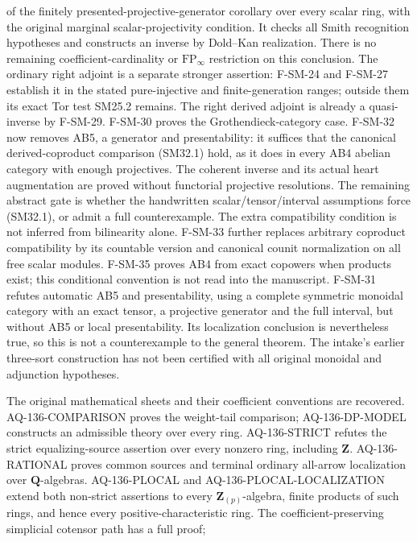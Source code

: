 \documentclass[11pt,a4paper]{article}
\theoremstyle{definition}\newtheorem{definition}[theorem]{Definition}
\theoremstyle{remark}\newtheorem{remark}[theorem]{Remark}
\begin{document}
\begin{description}[style=nextline,leftmargin=0pt,labelwidth=0pt,labelsep=0pt]
of the finitely presented-projective-generator corollary over every
scalar ring, with the original marginal scalar-projectivity condition.
It checks all Smith recognition hypotheses and constructs an inverse
by Dold--Kan realization. There is no remaining coefficient-cardinality
or $\mathrm{FP}_\infty$ restriction on this conclusion.
The ordinary right adjoint is a separate stronger assertion:
F-SM-24 and F-SM-27 establish it in the stated pure-injective and
finite-generation ranges; outside them its exact Tor test SM25.2
remains. The right derived adjoint is already a quasi-inverse by
F-SM-29. F-SM-30 proves the Grothendieck-category case.
F-SM-32 now removes AB5, a generator and presentability: it suffices
that the canonical derived-coproduct comparison (SM32.1) hold, as it
does in every AB4 abelian category with enough projectives. The
coherent inverse and its actual heart augmentation are proved without
functorial projective resolutions. The remaining abstract gate is
whether the handwritten scalar/tensor/interval assumptions force
(SM32.1), or admit a full counterexample. The extra compatibility
condition is not inferred from bilinearity alone. F-SM-33 further replaces arbitrary coproduct compatibility by its
countable version and canonical counit normalization on all free scalar
modules. F-SM-35 proves AB4 from exact copowers when products exist;
this conditional convention is not read into the manuscript.
F-SM-31 refutes automatic AB5 and presentability,
using a complete symmetric monoidal category with an exact tensor,
a projective generator and the full interval, but without AB5 or
local presentability. Its localization conclusion is nevertheless
true, so this is not a counterexample to the general theorem.
The intake's earlier
three-sort construction has not been certified with all original
monoidal and adjunction hypotheses.
\item[Cote 136, physical 111--121: the integral non-strict questions.]
The original mathematical sheets and their coefficient conventions
are recovered. AQ-136-COMPARISON proves the weight-tail comparison;
AQ-136-DP-MODEL constructs an admissible theory over every ring.
AQ-136-STRICT refutes the strict equalizing-source assertion over
every nonzero ring, including $\mathbf Z$.
AQ-136-RATIONAL proves common sources and terminal ordinary
all-arrow localization over $\mathbf Q$-algebras.
AQ-136-PLOCAL and AQ-136-PLOCAL-LOCALIZATION extend both non-strict
assertions to every $\mathbf Z_{(p)}$-algebra, finite products of such
rings, and hence every positive-characteristic ring.
The coefficient-preserving simplicial cotensor path has a full proof;

\end{description}
\end{document}
